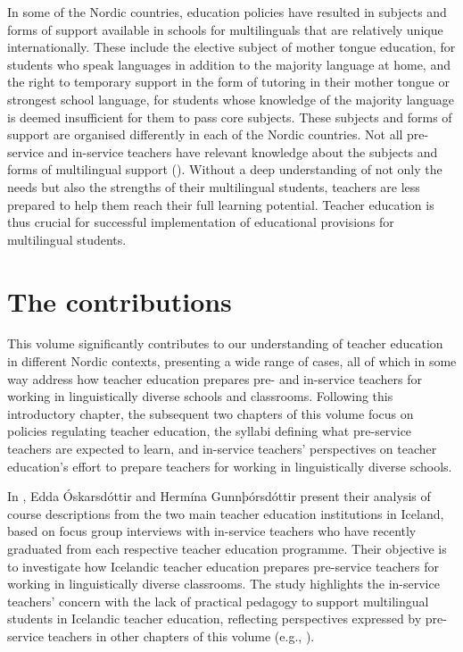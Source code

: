 \documentclass[output=paper]{langscibook}
\begin{document}
In some of the Nordic countries, education policies have resulted in subjects and forms of support available in schools for multilinguals that are relatively unique internationally. These include the elective subject of mother tongue education, for students who speak languages in addition to the majority language at home, and the right to temporary support in the form of tutoring in their mother tongue or strongest school language, for students whose knowledge of the majority language is deemed insufficient for them to pass core subjects. These subjects and forms of support are organised differently in each of the Nordic countries. Not all pre-service and in-service teachers have relevant knowledge about the subjects and forms of multilingual support (\citealt{BrorssonLainio2015}). Without a deep understanding of not only the needs but also the strengths of their multilingual students, teachers are less prepared to help them reach their full learning potential. Teacher education is thus crucial for successful implementation of educational provisions for multilingual students.

\section{{The contributions}}\label{sec:reath:6}

This volume significantly contributes to our understanding of teacher education in different Nordic contexts, presenting a wide range of cases, all of which in some way address how teacher education prepares pre- and in-service teachers for working in linguistically diverse schools and classrooms.  Following this introductory chapter, the subsequent two chapters of this volume focus on policies regulating teacher education, the syllabi defining what pre-service teachers are expected to learn, and in-service teachers’ perspectives on teacher education’s effort to prepare teachers for working in linguistically diverse schools. 

In , Edda Óskarsdóttir and Hermína Gunnþórsdóttir present their analysis of course descriptions from the two main teacher education institutions in Iceland, based on focus group interviews with in-service teachers who have recently graduated from each respective teacher education programme. Their objective is to investigate how Icelandic teacher education prepares pre-service teachers for working in linguistically diverse classrooms. The study highlights the in-service teachers’ concern with the lack of practical pedagogy to support multilingual students in Icelandic teacher education, reflecting perspectives expressed by pre-service teachers in other chapters of this volume (e.g., \cite{chapters/6_iversen, chapters/5_ostergaard}).
\end{document}

